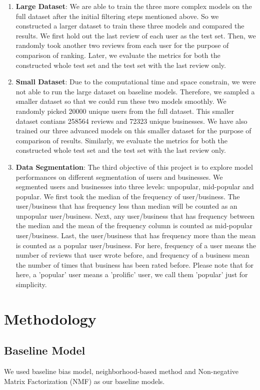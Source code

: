 \documentclass[journal]{IEEEtran}
\begin{document}
\begin{enumerate}
    \item {\bf Large Dataset}: We are able to train the three more complex models on the full dataset after the initial filtering steps mentioned above. So we constructed a larger dataset to train these three models and compared the results. We first hold out the last review of each user as the test set. Then, we randomly took another two reviews from each user for the purpose of comparison of ranking. Later, we evaluate the metrics for both the constructed whole test set and the test set with the last review only.
    \item {\bf Small Dataset}: Due to the computational time and space constrain, we were not able to run the large dataset on baseline models. Therefore, we sampled a smaller dataset so that we could run these two models smoothly. We randomly picked 20000 unique users from the full dataset. This smaller dataset contians 258564 reviews and 72323 unique businesses. We have also trained our three advanced models on this smaller dataset for the purpose of comparison of results. Similarly, we evaluate the metrics for both the constructed whole test set and the test set with the last review only.
    \item {\bf Data Segmentation}: The third objective of this project is to explore model performances on different segmentation of users and businesses. We segmented users and businesses into three levels: unpopular, mid-popular and popular. We first took the median of the frequency of user/business. The user/business that has frequency less than median will be counted as an unpopular user/business. Next, any user/business that has frequency between the median and the mean of the frequency column is counted as mid-popular user/business. Last, the user/business that has frequency more than the mean is counted as a popular user/business. For here, frequency of a user means the number of reviews that user wrote before, and frequency of a business mean the number of times that business has been rated before. Please note that for here, a 'popular' user means a 'prolific' user, we call them 'popular' just for simplicity.
\end{enumerate}



\section{Methodology}

\subsection{Baseline Model}
We used baseline bias model, neighborhood-based method and Non-negative Matrix Factorization (NMF) as our baseline models.
\end{document}
